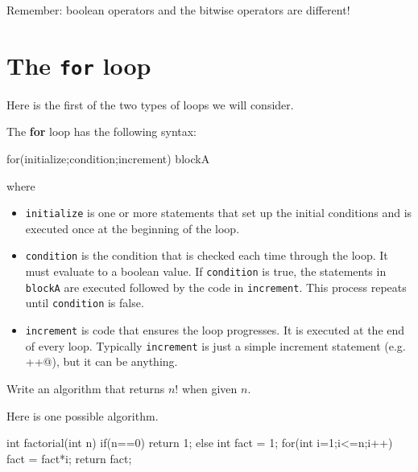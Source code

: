  \begin{rem}
Remember: boolean operators and the bitwise operators are different!
 \end{rem}


\newpage
\section{The {\tt for} loop}\label{section:for}

Here is the first of the two types of loops we will consider.

\begin{df}
The {\bf for} loop has the following 
syntax:
\begin{code}
    for(initialize;condition;increment) {
       blockA
    }
\end{code}
where 
\begin{itemize}
\item
\verb+initialize+ is one or more statements that set up the initial conditions and is
executed once at the beginning of the loop.
\item
\verb+condition+ is the condition that is checked each time through the loop. It must evaluate to a boolean value.
If \verb+condition+ is true, the statements in \verb+blockA+ are executed followed by the code in \verb+increment+.
This process repeats until \verb+condition+ is false.
\item
\verb+increment+ is code that ensures the loop progresses.
It is executed at the end of every loop.
Typically \verb+increment+ is just a simple increment statement
(e.g. \verb@i++@), but it can be anything.
\end{itemize}
\end{df}

\begin{exa}\label{exa:factorial}
Write an algorithm that returns $n!$  when given $n$.
\begin{sol}
Here is one possible algorithm.
\begin{code}
	int factorial(int n) {
	    if(n==0) {   return 1;
	    } else {
	        int fact = 1;
	        for(int i=1;i<=n;i++) {
	            fact = fact*i;
	        }
	        return fact;
	    }
	}
\end{code}
\end{sol}
\end{exa}

